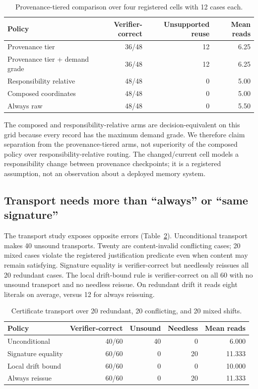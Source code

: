 \documentclass[10pt]{article}
\begin{document}
\begin{table}[t]
\centering
\small
\caption{Provenance-tiered comparison over four registered cells with 12 cases each.}
\label{tab:donor}
\begin{tabular}{lrrr}
\toprule
Policy & Verifier-correct & Unsupported reuse & Mean reads \\
\midrule
Provenance tier & 36/48 & 12 & 6.25 \\
Provenance tier + demand grade & 36/48 & 12 & 6.25 \\
Responsibility relative & 48/48 & 0 & 5.00 \\
Composed coordinates & 48/48 & 0 & 5.00 \\
Always raw & 48/48 & 0 & 5.50 \\
\bottomrule
\end{tabular}
\end{table}

The composed and responsibility-relative arms are decision-equivalent on this grid because every record has the maximum demand grade. We therefore claim separation from the provenance-tiered arms, not superiority of the composed policy over responsibility-relative routing. The changed/current cell models a responsibility change between provenance checkpoints; it is a registered assumption, not an observation about a deployed memory system.

\subsection{Transport needs more than ``always'' or ``same signature''}

The transport study exposes opposite errors (Table~\ref{tab:transport}). Unconditional transport makes 40 unsound transports. Twenty are content-invalid conflicting cases; 20 mixed cases violate the registered justification predicate even when content may remain satisfying. Signature equality is verifier-correct but needlessly reissues all 20 redundant cases. The local drift-bound rule is verifier-correct on all 60 with no unsound transport and no needless reissue. On redundant drift it reads eight literals on average, versus 12 for always reissuing.

\begin{table}[t]
\centering
\small
\caption{Certificate transport over 20 redundant, 20 conflicting, and 20 mixed shifts.}
\label{tab:transport}
\begin{tabular}{lrrrr}
\toprule
Policy & Verifier-correct & Unsound & Needless & Mean reads \\
\midrule
Unconditional & 40/60 & 40 & 0 & 6.000 \\
Signature equality & 60/60 & 0 & 20 & 11.333 \\
Local drift bound & 60/60 & 0 & 0 & 10.000 \\
Always reissue & 60/60 & 0 & 20 & 11.333 \\
\bottomrule
\end{tabular}
\end{table}
\end{document}
